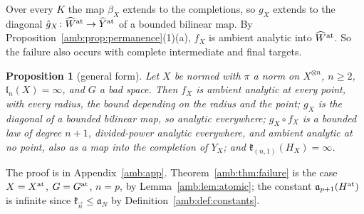 \documentclass[11pt]{amsart}
\newtheorem{proposition}[theorem]{Proposition}
\theoremstyle{definition}
\theoremstyle{remark}
\numberwithin{equation}{section}
\theoremstyle{plain}
\theoremstyle{definition}
\theoremstyle{plain}
\begin{document}
Over every $K$ the map $\beta_X$ extends to the completions, so $g_X$ extends to the diagonal $\hat g_X\colon\widehat W^{\rm at}\to\widehat Y^{\rm at}$ of a bounded bilinear map. By Proposition~\ref{amb:prop:permanence}(1)(a), $f_X$ is ambient analytic into $\widehat W^{\rm at}$. So the failure also occurs with complete intermediate and final targets.

\begin{proposition}[general form]\label{amb:prop:general-failure}
Let $X$ be normed with $\pi$ a norm on $X^{\otimes n}$, $n\ge2$, $\mathfrak l_n(X)=\infty$, and $G$ a bad space. Then $f_X$ is ambient analytic at every point, with every radius, the bound depending on the radius and the point; $g_X$ is the diagonal of a bounded bilinear map, so analytic everywhere; $g_X\circ f_X$ is a bounded law of degree $n+1$, divided-power analytic everywhere, and ambient analytic at no point, also as a map into the completion of $Y_X$; and $\mathfrak k_{(n,1)}(H_X)=\infty$.
\end{proposition}
The proof is in Appendix~\ref{amb:app}. Theorem~\ref{amb:thm:failure} is the case $X=X^{\rm at}$, $G=G^{\rm at}$, $n=p$, by Lemma~\ref{amb:lem:atomic}; the constant $\mathfrak a_{p+1}(H^{\rm at})$ is infinite since $\mathfrak k_{\vec n}\le\mathfrak a_N$ by Definition~\ref{amb:def:constants}.
\end{document}
